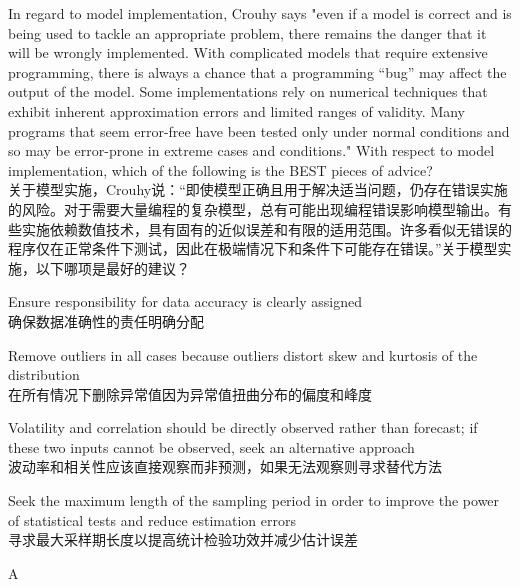 \documentclass{article}
\newcounter{question} %
\begin{document}
\begin{question}
    In regard to model implementation, Crouhy says "even if a model is correct and is being used to tackle an appropriate problem, there remains the danger that it will be wrongly implemented. With complicated models that require extensive programming, there is always a chance that a programming “bug” may affect the output of the model. Some implementations rely on numerical techniques that exhibit inherent approximation errors and limited ranges of validity. Many programs that seem error-free have been tested only under normal conditions and so may be error-prone in extreme cases and conditions." With respect to model implementation, which of the following is the BEST pieces of advice?
    \\关于模型实施，Crouhy说：“即使模型正确且用于解决适当问题，仍存在错误实施的风险。对于需要大量编程的复杂模型，总有可能出现编程错误影响模型输出。有些实施依赖数值技术，具有固有的近似误差和有限的适用范围。许多看似无错误的程序仅在正常条件下测试，因此在极端情况下和条件下可能存在错误。”关于模型实施，以下哪项是最好的建议？
\end{question}

\begin{choices}
    \item Ensure responsibility for data accuracy is clearly assigned\\
    确保数据准确性的责任明确分配
    \item Remove outliers in all cases because outliers distort skew and kurtosis of the distribution\\
    在所有情况下删除异常值因为异常值扭曲分布的偏度和峰度
    \item Volatility and correlation should be directly observed rather than forecast; if these two inputs cannot be observed, seek an alternative approach\\
    波动率和相关性应该直接观察而非预测，如果无法观察则寻求替代方法
    \item Seek the maximum length of the sampling period in order to improve the power of statistical tests and reduce estimation errors\\
    寻求最大采样期长度以提高统计检验功效并减少估计误差
\end{choices}

\begin{correctanswer}
    A
\end{correctanswer}
\end{document}
